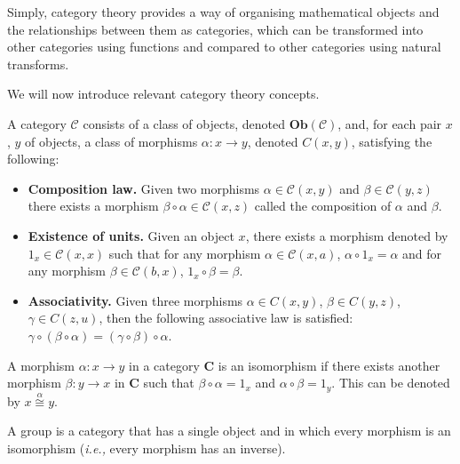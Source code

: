 Simply, category theory provides a way of organising mathematical objects and the relationships between them as categories, which can be transformed into other categories using functions and compared to other categories using natural transforms.

We will now introduce relevant category theory concepts.

\begin{definition}[Category]\label{def:category}
    A category $\mathcal{C}$ consists of a class of objects, denoted $\textbf{Ob}(\mathcal{C})$, and, for each pair $x$, $y$ of objects, a class of morphisms $\alpha : x \to y$, denoted $C(x,y)$, satisfying the following:

    \begin{itemize}
        \item \textbf{Composition law.} Given two morphisms $\alpha \in \mathcal{C}(x,y)$ and $\beta \in \mathcal{C}(y,z)$ there exists a morphism $\beta \circ \alpha \in \mathcal{C}(x,z)$ called the composition of $\alpha$ and $\beta$.
        
        \item \textbf{Existence of units.} Given an object $x$, there exists a morphism denoted by $1_{x} \in \mathcal{C}(x,x)$ such that for any morphism $\alpha \in \mathcal{C}(x,a)$, $\alpha \circ 1_{x} = \alpha$ and for any morphism $\beta \in \mathcal{C}(b,x)$, $1_{x} \circ \beta = \beta$.
        
        \item \textbf{Associativity.} Given three morphisms $\alpha \in C(x,y)$, $\beta \in C(y,z)$, $\gamma \in C(z,u)$, then the following associative law is satisfied: $\gamma \circ ( \beta \circ \alpha) = (\gamma \circ \beta) \circ \alpha$.
    \end{itemize}
\end{definition}

\begin{definition}[Isomorphism]\label{def:isomorphism}
    A morphism $\alpha : x \to y$ in a category \textbf{C} is an isomorphism if there exists another morphism $\beta : y \to x$ in \textbf{C} such that $\beta \circ \alpha = 1_{x}$ and $\alpha \circ \beta = 1_{y}$.
    This can be denoted by $x \overset{\alpha}{\cong} y$.
\end{definition}

\begin{definition}[Group]
    A group is a category that has a single object and in which every morphism is an isomorphism (\textit{i.e.,} every morphism has an inverse).
\end{definition}


